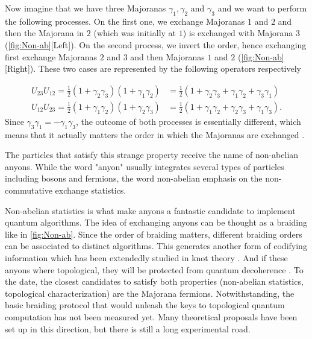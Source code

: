 Now imagine that we have three Majoranas $\gamma_1, \gamma_2$ and $\gamma_3$ and we want to perform the following processes. On the first one, we exchange Majoranas $1$ and $2$ and then the Majorana in $2$ (which was initially at $1$) is exchanged with Majorana $3$ (\ref{fig:Non-ab}[Left]). On the second process, we invert the order, hence exchanging first exchange Majoranas $2$ and $3$ and then Majoranas $1$ and $2$ (\ref{fig:Non-ab}[Right]). These two cases are represented by the following operators respectively 

\begin{equation}
  \begin{aligned}
   U_{23}U_{12} = \frac{1}{2}\left( 1 + \gamma_2 \gamma_3 \right)\left( 1 + \gamma_1 \gamma_2 \right) &= \frac{1}{2}\left( 1 + \gamma_2 \gamma_3 + \gamma_1 \gamma_2 + \gamma_3 \gamma_1\right)
    \\
   U_{12}U_{23} = \frac{1}{2}\left( 1 + \gamma_1 \gamma_2 \right)\left( 1 + \gamma_2 \gamma_3 \right) &= \frac{1}{2}\left( 1 + \gamma_1 \gamma_2 +\gamma_2 \gamma_3 + \gamma_1 \gamma_3\right).
  \end{aligned}
\end{equation}
\noindent Since $\gamma_3 \gamma_1 = -\gamma_1 \gamma_3$, the outcome of both processes is essentially different, which means that it actually matters the order in which the Majoranas are exchanged .

 The particles that satisfy this strange property receive the name of non-abelian anyons. While the word "anyon" usually integrates several types of particles  including bosons and fermions, the word non-abelian emphasis on the non-commutative exchange statistics. 

 Non-abelian statistics is what make anyons a fantastic candidate to implement quantum algorithms. The idea of exchanging anyons can be thought as a braiding like in \ref{fig:Non-ab}. Since the order of braiding matters, different braiding orders  can be associated to distinct algorithms. This generates another form of codifying information  which has been extendedly studied in knot theory \cite{turaev_book}. And if these anyons where topological, they will be protected from quantum decoherence \cite{nayak_non-abelian_2008}. To the date, the closest candidates to satisfy both properties (non-abelian statistics, topological characterization) are  the Majorana fermions. Notwithstanding, the basic braiding protocol that would unleash the keys to topological quantum computation \cite{pachos_introduction_2012} has not been measured yet. Many theoretical proposals have been set up in this direction, but there is still a long experimental road. 





